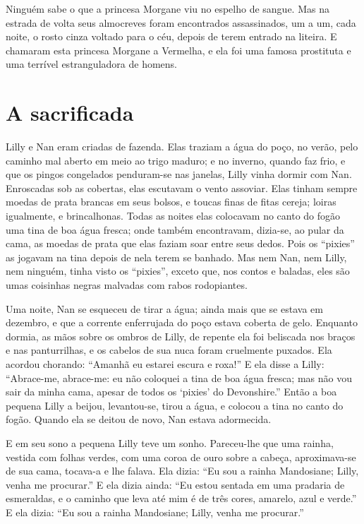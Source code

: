 Ninguém sabe o que a princesa Morgane viu no espelho de sangue. Mas na
estrada de volta seus almocreves foram encontrados assassinados, um a um,
cada noite, o rosto cinza voltado para o céu, depois de terem entrado na
liteira. E chamaram esta princesa Morgane a Vermelha, e ela foi uma famosa
prostituta e uma terrível estranguladora de homens.

\section*{A sacrificada}

Lilly e Nan eram criadas de fazenda. Elas traziam a água do poço, no
verão, pelo caminho mal aberto em meio ao trigo maduro; e no inverno, quando faz
frio, e que os pingos congelados penduram-se nas janelas, Lilly vinha
dormir com Nan. Enroscadas sob as cobertas, elas escutavam o vento
assoviar. Elas tinham sempre moedas de prata brancas em seus bolsos, e toucas finas
de fitas cereja; loiras igualmente, e brincalhonas. Todas as noites elas
colocavam no canto do fogão uma tina de boa água fresca; onde também
encontravam, dizia-se, ao pular da cama, as moedas de prata que elas faziam soar
entre seus dedos. Pois os “pixies” as jogavam na tina depois de nela terem se
banhado. Mas nem Nan, nem Lilly, nem ninguém, tinha visto os “pixies”, exceto que,
nos contos e baladas, eles são umas coisinhas negras malvadas com rabos
rodopiantes.

Uma noite, Nan se esqueceu de tirar a água; ainda mais que se estava em
dezembro, e que a corrente enferrujada do poço estava coberta de gelo.
Enquanto dormia, as mãos sobre os ombros de Lilly, de repente ela foi
beliscada nos braços e nas panturrilhas, e os cabelos de sua nuca foram
cruelmente puxados. Ela acordou chorando: ``Amanhã eu estarei escura e
roxa!'' E ela disse a Lilly: “Abrace-me, abrace-me: eu não coloquei a tina
de boa água fresca; mas não vou sair da minha cama, apesar de todos os
`pixies' do Devonshire.” Então a boa pequena Lilly a beijou, levantou-se,
tirou a água, e colocou a tina no canto do fogão. Quando ela se deitou de
novo, Nan estava adormecida.


E em seu sono a pequena Lilly teve um sonho. Pareceu-lhe que uma
rainha, vestida com folhas verdes, com uma coroa de ouro sobre a cabeça,
aproximava-se de sua cama, tocava-a e lhe falava. Ela dizia: “Eu sou a
rainha Mandosiane; Lilly, venha me procurar.” E ela dizia ainda: “Eu estou
sentada em uma pradaria de esmeraldas, e o caminho que leva até mim é de
três cores, amarelo, azul e verde.” E ela dizia: “Eu sou a rainha
Mandosiane; Lilly, venha me procurar.”

